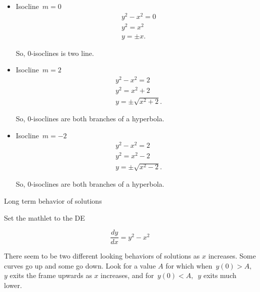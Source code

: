 \begin{itemize}
\item Isocline $\, m = 0 \,$ \\

  \begin{align*}
    &y^2 - x^2 = 0 \\
    &y^2 = x^2 \\
    &y = \pm x. 
  \end{align*}

  So, $0$-isoclines is two line.

\item Isocline $\, m = 2 \,$ \\

  \begin{align*}
    &y^2 - x^2 = 2 \\
    &y^2 = x^2 + 2 \\
    &y = \pm \sqrt{x^2 + 2}. 
  \end{align*}

  So, $0$-isoclines are both branches of a hyperbola.

\item Isocline $\, m = -2 \,$ \\

  \begin{align*}
    &y^2 - x^2 = 2 \\
    &y^2 = x^2 - 2 \\
    &y = \pm \sqrt{x^2 - 2}. 
  \end{align*}

  So, $0$-isoclines are both branches of a hyperbola.
\end{itemize}

\begin{problem}
  Long term behavior of solutions
\end{problem}

Set the mathlet to the DE

\begin{equation*}
  \frac{dy}{dx} = y^2 - x^2
\end{equation*}

There seem to be two different looking behaviors of solutions as $x$ increases.
Some curves go up and some go down.
Look for a value $A$ for which when $\, y(0)>A ,\,$ $y$ exits the frame upwards as $x$ increases,
and for $\, y(0)<A,\,$  $y$ exits much lower. 



